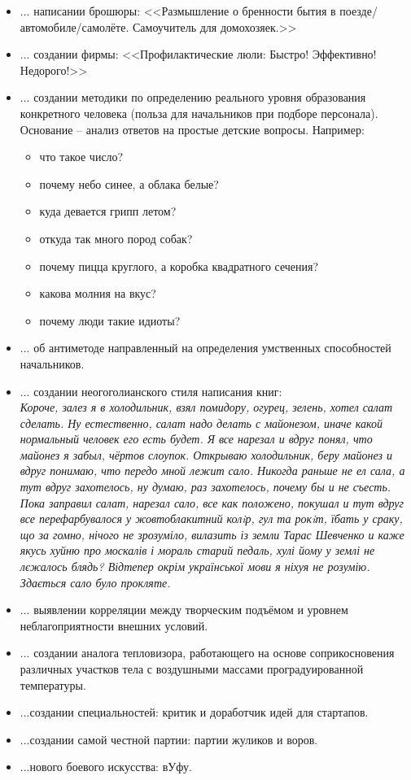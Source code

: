\begin{itemize}
    \item ... написании брошюры: <<Размышление о бренности бытия в поезде/автомобиле/самолёте. Самоучитель для домохозяек.>>
    \item ... создании фирмы: <<Профилактические люли: Быстро! Эффективно! Недорого!>>
    \item ...  создании методики по определению реального уровня образования конкретного человека (польза для начальников при подборе персонала). Основание -- анализ ответов на простые детские вопросы.
    Например:
        \begin{itemize}
            \item что такое число?
            \item почему небо синее, а облака белые?
            \item куда девается грипп летом?
            \item откуда так много пород собак?
            \item почему пицца круглого, а коробка квадратного сечения?
            \item какова молния на вкус?
            \item почему люди такие идиоты?
        \end{itemize}
    \item ... об антиметоде направленный на определения умственных способностей начальников.    
    \item ... создании неогоголианского стиля написания книг:\\
        \emph{Короче, залез я в холодильник, взял помидору, огурец, зелень, хотел салат сделать. Ну естественно, 
            салат надо делать с майонезом, иначе какой нормальный человек его есть будет. Я все нарезал и вдруг 
            понял, что майонез я забыл, чёртов слоупок. Открываю холодильник, беру майонез и вдруг понимаю, что 
            передо мной лежит сало. Никогда раньше не ел сала, а тут вдруг захотелось, ну думаю, раз захотелось, 
            почему бы и не съесть. Пока заправил салат, нарезал сало, все как положено, покушал и тут вдруг все 
            перефарбувалося у жовтоблакитний колiр, гул та рокiт, їбать у сраку, що за гомно, нічого не 
            зрозуміло, вилазить із земли Тарас Шевченко и каже якусь хуйню про москалів і мораль старий педаль, 
            хулі йому у землі не лєжалось блядь? Відтепер окрім української мови я ніхуя не розумію. Здається 
            сало було прокляте.}
    \item ... выявлении корреляции между творческим подъёмом и уровнем неблагоприятности внешних условий.
    \item ... создании аналога тепловизора, работающего на основе соприкосновения различных участков тела с воздушными массами проградуированной температуры.
    \item ...создании специальностей: критик и доработчик идей для стартапов.
    \item ...создании самой честной партии: партии жуликов и воров.
    \item ...нового боевого искусства: вУфу.
\end{itemize}
